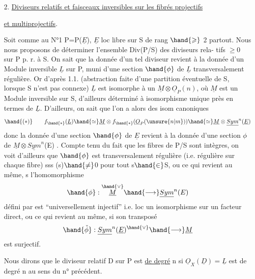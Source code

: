 
2. \uline{Diviseurs relatifs et faisceaux inversibles sur les fibrés projectifs}

\uline{et multiprojectifs}.

 Soit comme au N°1 P=P($\underline{E}$), $\underline{E}$ loc libre sur S de rang $\hand{\geqslant}$ 2 partout.
Nous nous proposons de déterminer l'ensemble Div(P/S) des diviseurs rela-%
tifs $\geqslant 0$ sur P p. r. à S. On sait que la donnée d'un tel diviseur revient à la
donnée d'un Module inversible $\underline{L}$ sur P, muni d'une section $\hand{\phi}$ de $\underline{L}$
transversalement régulière. Or d'après 1.1. (abstraction faite d'une
partition éventuelle de S, lorsque S n'est pas connexe) $\underline{L}$ est isomorphe
à un $\underline{M}\otimes\underline{O}_P(n)$, où $\underline{M}$ est un Module inversible sur S, d'ailleurs déterminé
à isomorphisme unique près en termes de $\underline{L}$. D'ailleurs, on sait que
l'on a alors des isom canoniques
\[ \hand{(*)} \qquad f_{\hand{*}}(\underline{L}) \hand{\simeq} \underline{M}\otimes f_{\hand{*}}(\underline{O}_P(\unsure{n|m})) \hand{\simeq} \underline{M}\otimes\underline{Sym}^n(\underline{E}) \]
donc la donnée d'une section  $\hand{\phi}$ de $\underline{E}$ revient à la donnée d'une section
$\phi$ de $\underline{M}\otimes\underline{Sym}^n$(E) . Compte tenu du fait que les fibres de P/S sont intègres,
on voit d'ailleurs que $\hand{\phi}$ est transversalement régulière (i.e. régulière
sur chaque fibre) sss \hand{$\phi$}(s)$\hand{\neq}$0 pour tout s$\hand{\in}$S, ou ce qui revient au même,
s l'homomorphisme
\[ \hand{\phi} : \overset{\hand{\vee}}{\underline{M}} \hand{\longrightarrow} \underline{Sym}^n(E) \]
défini par \hand{$\phi$} est ``universellement injectif'' i.e. loc un isomorphisme sur
un facteur direct, ou ce qui revient au même, si son transposé
\[ \hand{\check{\phi}} : \underline{Sym}^n(\underline{E})^{\hand{\vee}} \hand{\longrightarrow} \underline{M} \]
est surjectif.

Nous dirons que le diviseur relatif D sur P est \uline{de degré} n
si $\underline{O}_X(\underline{D})= \underline{L}$ est de degré n au sens du n° précédent. 



